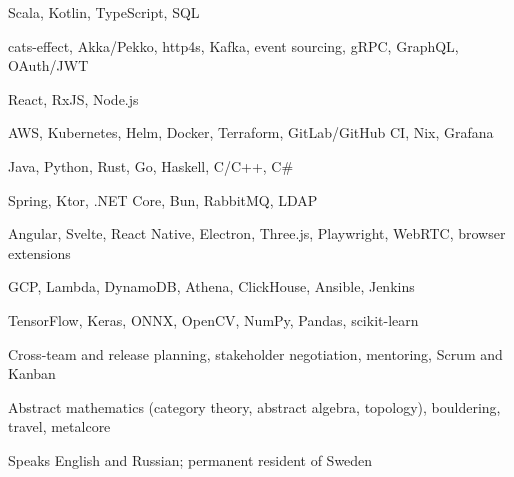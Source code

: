 

\begin{cvhonors}

	{Scala, Kotlin, TypeScript, SQL}
	{}
	{}

	{cats-effect, Akka/Pekko, http4s, Kafka, event sourcing, gRPC, GraphQL, OAuth/JWT}
	{}
	{}

	{React, RxJS, Node.js}
	{}
	{}

	{AWS, Kubernetes, Helm, Docker, Terraform, GitLab/GitHub CI, Nix, Grafana}
	{}
	{}

\end{cvhonors}


\begin{cvhonors}

	{Java, Python, Rust, Go, Haskell, C/C++, C\#}
	{}
	{}

	{Spring, Ktor, .NET Core, Bun, RabbitMQ, LDAP}
	{}
	{}

	{Angular, Svelte, React Native, Electron, Three.js, Playwright, WebRTC, browser extensions}
	{}
	{}

	{GCP, Lambda, DynamoDB, Athena, ClickHouse, Ansible, Jenkins}
	{}
	{}

	{TensorFlow, Keras, ONNX, OpenCV, NumPy, Pandas, scikit-learn}
	{}
	{}

\end{cvhonors}


\begin{cvhonors}

	{Cross-team and release planning, stakeholder negotiation, mentoring, Scrum and Kanban}
	{}
	{}

	{Abstract mathematics (category theory, abstract algebra, topology), bouldering, travel, metalcore}
	{}
	{}

	{Speaks English and Russian; permanent resident of Sweden}
	{}
	{}

\end{cvhonors}
